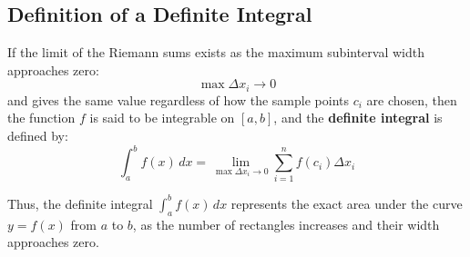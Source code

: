 \documentclass[11pt]{article}
\begin{document}
\subsection{Definition of a Definite Integral}
If the limit of the Riemann sums exists as the maximum subinterval width approaches zero:
\[
    \max \Delta x_i \to 0
\]
and gives the same value regardless of how the sample points $c_i$ are chosen, then the function $f$ is said to be integrable on $[a, b]$, and the \textbf{definite integral} is defined by:
\[
    \int_a^b f(x)\, dx = \lim_{\max \Delta x_i \to 0} \sum_{i=1}^n f(c_i) \Delta x_i
\]
\begin{center}
\end{center}
Thus, the definite integral $\displaystyle\int_a^b f(x)\, dx$ represents the exact area under the curve $y = f(x)$ from $a$ to $b$, as the number of rectangles increases and their width approaches zero.
\end{document}
